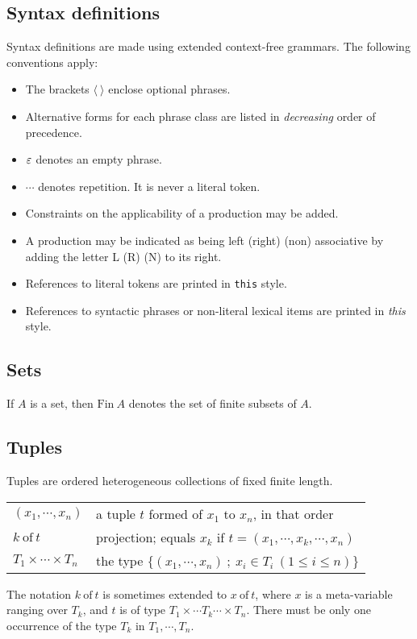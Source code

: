 \subsection{Syntax definitions}
Syntax definitions are made using extended context-free grammars.
The following conventions apply:
\begin{itemize}
\item The brackets $\langle~\rangle$ enclose optional phrases.
\item Alternative forms for each phrase class are listed in \emph{decreasing}
order of precedence.
\item $\varepsilon$ denotes an empty phrase.
\item $\cdots$ denotes repetition. It is never a literal token.
\item Constraints on the applicability of a production may be added.
\item A production may be indicated as being left (right) (non) associative
by adding the letter L (R) (N) to its right.
\item References to literal tokens are printed in \texttt{this} style.
\item References to syntactic phrases or non-literal lexical items
are printed in \emph{this} style.
\end{itemize}
%
\subsection{Sets}
If $A$ is a set, then $\mathrm{Fin}~A$ denotes the set of finite subsets of $A$.
%
\subsection{Tuples}
Tuples are ordered heterogeneous collections of fixed finite length.
\smallskip\par\noindent\begin{tabular}{@{}l@{~}l}
$(x_1,\cdots,x_n)$ & a tuple $t$ formed of $x_1$ to $x_n$, in that order\\
$k~\mathrm{of}~t$ & projection; equals $x_k$ if $t = (x_1,\cdots,x_k,\cdots,x_n)$\\
$T_1\times\cdots\times T_n$ & the type $\{(x_1,\cdots,x_n) ~;~ x_i \in T_i ~(1\leq i\leq n)\}$\\
\end{tabular}
\smallskip\par
The notation $k~\mathrm{of}~t$ is sometimes extended to $x~\mathrm{of}~t$, where
$x$ is a meta-variable ranging over $T_k$, and $t$ is of type
$T_1\times\cdots T_k\cdots\times T_n$. There must be only one
occurrence of the type $T_k$ in $T_1,\cdots,T_n$.
%
